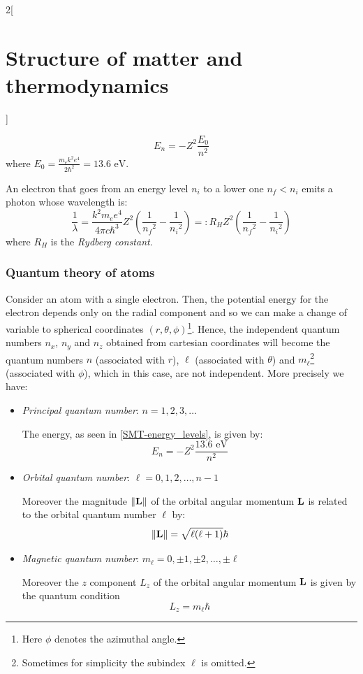 \documentclass[../../../main.tex]{subfiles}
\begin{document}
\begin{multicols}{2}[\section{Structure of matter and thermodynamics}]
\begin{prop}
\begin{equation}
            E_n=-Z^2\frac{E_0}{n^2}
        \end{equation}
        where $E_0=\frac{m_ek^2e^4}{2\hbar^2}=13.6\text{ eV}$.
    \end{prop}
    \begin{prop}
        An electron that goes from an energy level $n_i$ to a lower one $n_f<n_i$ emits a photon whose wavelength is:
        $$\frac{1}{\lambda}=\frac{k^2m_ee^4}{4\pi c\hbar^3}Z^2\left(\frac{1}{{n_f}^2}-\frac{1}{{n_i}^2}\right)=:R_HZ^2\left(\frac{1}{{n_f}^2}-\frac{1}{{n_i}^2}\right)$$
        where $R_H$ is the \textit{Rydberg constant}.
    \end{prop}
    \subsubsection*{Quantum theory of atoms}
    \begin{definition}
        Consider an atom with a single electron. Then, the potential energy for the electron depends only on the radial component and so we can make a change of variable to spherical coordinates $(r,\theta,\phi)$\footnote{Here $\phi$ denotes the azimuthal angle.}. Hence, the independent quantum numbers $n_x$, $n_y$ and $n_z$ obtained from cartesian coordinates will become the quantum numbers $n$ (associated with $r$), $\ell$ (associated with $\theta$) and $m_\ell$\footnote{Sometimes for simplicity the subindex $\ell$ is omitted.} (associated with $\phi$), which in this case, are not independent. More precisely we have:
        \begin{itemize}
            \item \textit{Principal quantum number}: $n=1,2,3,\ldots$\par
                  The energy, as seen in \eqref{SMT-energy_levels}, is given by: $$E_n=-Z^2\frac{13.6\text{ eV}}{n^2}$$
            \item \textit{Orbital quantum number}: $\ell=0,1,2,\ldots,n-1$\par Moreover the magnitude $\|\vb{L}\|$ of the orbital angular momentum $\vb{L}$ is related to the orbital quantum number $\ell$ by: $$\|\vb{L}\|=\sqrt{\ell(\ell+1)}\hbar$$
            \item \textit{Magnetic quantum number}: $m_\ell=0,\pm 1,\pm 2,\ldots,\pm\ell$\par
                  Moreover the $z$ component $L_z$ of the orbital angular momentum $\vb{L}$ is given by the quantum condition $$L_z=m_\ell\hbar$$

\end{itemize}
\end{definition}
\end{multicols}
\end{document}
